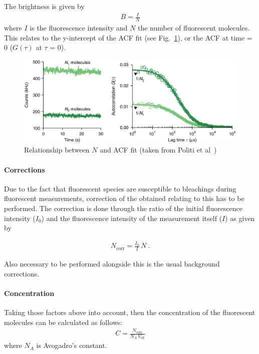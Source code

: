 The brightness is given by 
\begin{align} 
B = \frac{I}{N}
\end{align} 
where $I$ is the fluorescence intensity and $N$ the number of fluorescent molecules. This relates to the y-intercept of the ACF fit (see Fig.~\ref{fig:poliacf}), or the ACF at time = 0 ($G(\tau)$ at $\tau$ = 0).  

\begin{figure}[h!]
	\centering
	\includegraphics[width=.6\columnwidth]{Exp_9_FCS/Figures/npol}
	\caption{Relationship between $N$ and ACF fit (taken from Politi et al~\cite{Politi2018})}
	\label{fig:poliacf}
\end{figure}

\paragraph{Corrections}
Due to the fact that fluorescent species are susceptible to bleachings during fluorescent measurements, correction of the obtained relating to this has to be performed. 
The correction is done through the ratio of the initial fluorescence intensity ($I_{0}$) and the fluorescence intensity of the measurement itself ($I$) as given by

\begin{align} 
N_{\text{corr}}=\frac{I_{0}}{I}\,N~\text{.}
\end{align} 

Also necessary to be performed alongside this is the usual background corrections. 

\paragraph{Concentration}
Taking those factors above into account, then the concentration of the fluorescent molecules can be calculated as follows:
\begin{align} 
C=\frac{N_{\text{corr}}}{N_{A}\,V_{\text{eff}}} 
\end{align} 
where $N_{A}$ is Avogadro's constant.

